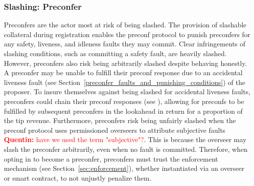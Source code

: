 \documentclass[a4paper]{article}
\theoremstyle{boldstyle}
\newcommand{\qb}[1]{\textcolor{red}{\textbf{Quentin:} #1}}
\begin{document}
    \subsubsection{Slashing: Preconfer}
        Preconfers are the actor most at risk of being slashed.
        The provision of slashable collateral during registration enables the preconf protocol to punish preconfers for any safety, liveness, and idleness faults they may commit. 
        Clear infringements of slashing conditions, such as committing a safety fault, are heavily slashed.
        However, preconfers also risk being arbitrarily slashed despite behaving honestly. A preconfer may be unable to fulfill their preconf response due to an accidental liveness fault (see Section~\ref{preconfer_faults_and_punishing_conditions}) of the proposer.
        To insure themselves against being slashed for accidental liveness faults, preconfers could chain their preconf responses (see \cite{W:AvoidingAccidentalLivenessFaultsforBasedPreconfs}), allowing for preconfs to be fulfilled by subsequent preconfers in the lookahead in return for a proportion of the tip revenue.
        Furthermore, preconfers risk being unfairly slashed when the preconf protocol uses permissioned overseers to attribute subjective faults \qb{have we used the term "subjective"?}. This is because the overseer may slash the preconfer arbitrarily, even when no fault is committed.
        Therefore, when opting in to become a preconfer, preconfers must trust the enforcement mechanism (see Section~\ref{sec:enforcement}), whether instantiated via an overseer or smart contract, to not unjustly penalize them. 
        
\end{document}
